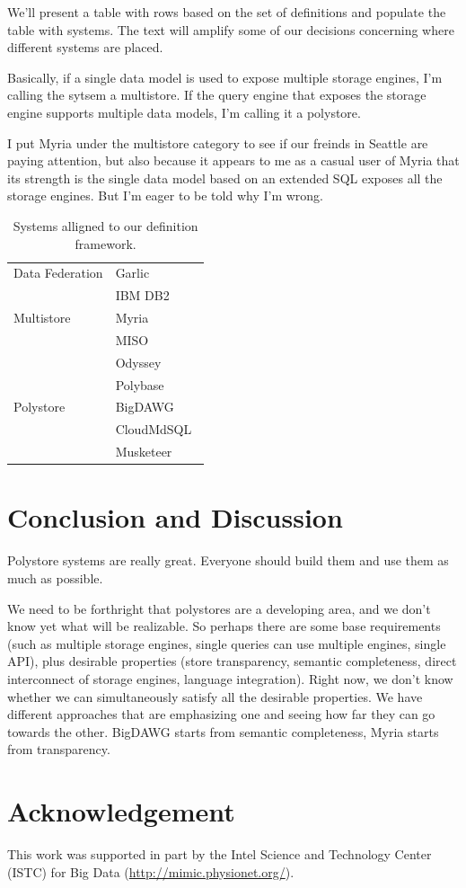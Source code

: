 \documentclass[conference]{IEEEtran}
\begin{document}
We'll present a table with rows based on the set of definitions
and populate the table with systems.  The text will amplify some of
our decisions concerning where different systems are placed.

Basically, if a single data model is used to expose multiple 
storage engines, I'm calling the sytsem a multistore.  If 
the query engine that exposes the storage engine supports multiple
data models, I'm calling it a polystore.  

I put Myria under the multistore category to see if our freinds
in Seattle are paying attention, but also because it appears to 
me as a casual user of Myria that its strength is the single data model
based on an extended SQL exposes all the storage engines.  But I'm 
eager to be told why I'm wrong.

\begin{table}[h!]
  \centering
  \caption{Systems alligned to our definition framework.}
  \label{tab:relWrk}
  \begin{tabular}{l|l}
    \hline
    Data Federation  & Garlic~\cite{Carey1995towards} \\
                     & IBM DB2~\cite{Gassner1993query}\\
    \hline
    Multistore       & Myria~\cite{Halperin2014demo} \\
                     & MISO~\cite{miso2014}  \\
                     & Odyssey~\cite{odyssey2013}\\
                     & Polybase~\cite{polybase2013}\\
    \hline
    Polystore        & BigDAWG~\cite{Duggan2015,Gadepally2016} \\
                     & CloudMdSQL~\cite{cloudMdSQL2016} \\
                     & Musketeer~\cite{musketeer2015}\\
  \end{tabular}
\end{table}

\section{Conclusion and Discussion}
\label{conc}

Polystore systems are really great.  Everyone should build them
and use them as much as possible.

We need to be forthright that polystores are a developing area, 
and we don't know yet what will be realizable. So perhaps there 
are some base requirements (such as multiple storage engines, 
single queries can use multiple engines, single API), plus desirable 
properties (store transparency, semantic completeness, direct 
interconnect of storage engines, language integration). Right now, 
we don't know whether we can simultaneously satisfy all the desirable 
properties. We have different approaches that are emphasizing one 
and seeing how far they can go towards the other. BigDAWG starts 
from semantic completeness, Myria starts from transparency.

\section*{Acknowledgement}
This work was supported in part by the Intel Science and Technology
Center (ISTC) for Big Data (\url{http://mimic.physionet.org/}).





\end{document}

